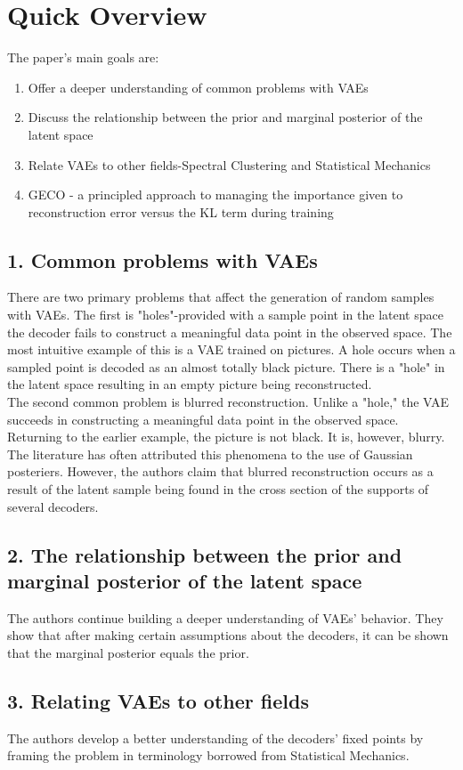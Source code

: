 \chapter*{Quick Overview}
The paper's main goals are:
\begin{enumerate}
\item Offer a deeper understanding of common problems with VAEs
\item Discuss the relationship between the prior and marginal posterior of the latent space
\item Relate VAEs to other fields-Spectral Clustering and Statistical Mechanics
\item GECO - a principled approach to managing the importance given to reconstruction error versus the KL term during training
\end{enumerate}

\section*{1. Common problems with VAEs}
There are two primary problems that affect the generation of random samples with VAEs. The first is "holes"-provided with a sample point in the latent space the decoder fails to construct a meaningful data point in the observed space. The most intuitive example of this is a VAE trained on pictures. A hole occurs when a sampled point is decoded as an almost totally black picture. There is a "hole" in the latent space resulting in an empty picture being reconstructed.\\
The second common problem is blurred reconstruction. Unlike a "hole," the VAE succeeds in constructing a meaningful data point in the observed space. Returning to the earlier example, the picture is not black. It is, however, blurry. The literature has often attributed this phenomena to the use of Gaussian posteriers. However, the authors claim that blurred reconstruction occurs as a result of the latent sample being found in the cross section of the supports of several decoders. \\
\section*{2. The relationship between the prior and marginal posterior of the latent space}
The authors continue building a deeper understanding of VAEs' behavior. They show that after making certain assumptions about the decoders, it can be shown that the marginal posterior equals the prior.
\section*{3. Relating VAEs to other fields}
The authors develop a better understanding of the decoders' fixed points by framing the problem in terminology borrowed from Statistical Mechanics. 
